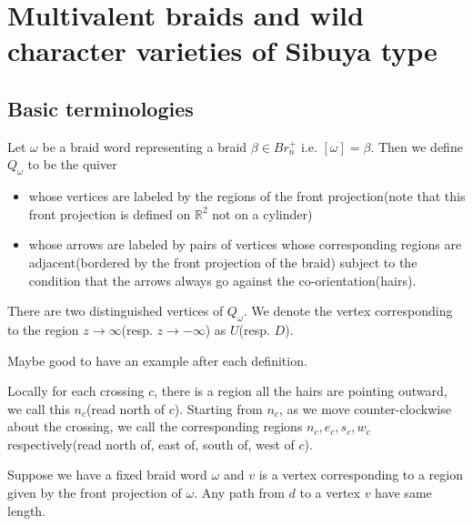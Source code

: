 \chapter{Multivalent braids and wild character varieties of Sibuya type}
\section{Basic terminologies} 
\begin{definition}
	Let $\omega$ be a braid word representing a braid $\beta\in Br_n^+$ i.e. $[\omega] = \beta$. Then we define $Q_{\omega}$ to be the quiver 
\begin{itemize}
		\item whose vertices are labeled by the regions of the front projection(note that this front projection is defined on $\mathbb{R}^2$ not on a cylinder)
		\item whose arrows are labeled by pairs of vertices whose corresponding regions are adjacent(bordered by the front projection of the braid) subject to the condition that the arrows always go against the co-orientation(hairs).
	\end{itemize}
There are two distinguished vertices of $Q_\omega$. We denote the vertex corresponding to the region $z\rightarrow \infty$(resp. $z\rightarrow -\infty$) as $U$(resp. $D$).
\end{definition}
Maybe good to have an example after each definition.
\begin{definition}
	Locally for each crossing $c$, there is a region all the hairs are pointing outward, we call this $n_c$(read north of $c$). Starting from $n_c$, as we move counter-clockwise about the crossing, we call the corresponding regions $n_c,e_c,s_c,w_c$ respectively(read north of, east of, south of, west of $c$).
\end{definition}
\begin{theorem}
	Suppose we have a fixed braid word $\omega$ and $v$ is a vertex corresponding to a region given by the front projection of $\omega$. Any path from $d$ to a vertex $v$ have same length.
\end{theorem}
